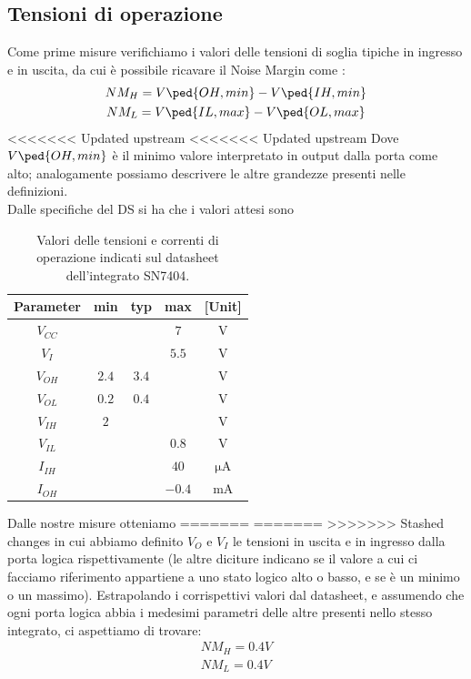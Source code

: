 \documentclass[10pt, a4paper, italian]{article}
\begin{document}
\subsection{Tensioni di operazione}
\label{TENSIONI}
Come prime misure verifichiamo i valori delle tensioni di soglia tipiche in ingresso e in uscita, da cui è possibile ricavare il Noise Margin come :
\begin{gather*}
    NM_H = V\ped{OH, min} - V\ped{IH, min}\\
    NM_L = V\ped{IL,max} - V\ped{OL, max}
\end{gather*}
<<<<<<< Updated upstream
<<<<<<< Updated upstream
Dove $V\ped{OH, min}$ è il minimo valore interpretato in output dalla porta come alto; analogamente possiamo descrivere le altre grandezze presenti nelle definizioni.\\
Dalle specifiche del DS si ha che i valori attesi sono %
\begin{table}[htb]
\centering
\begin{tabular}{cccc|c}
\toprule
Parameter  & min & typ & max & [Unit] \\
\midrule
\midrule
$V_{CC}$ &  &  & $7$ & V \\
$V_I$	 &  &  & $5.5$ & V\\
$V_{OH}$ & $2.4$  & $3.4$ & & V \\
$V_{OL}$ & $0.2$  & $0.4$ & & V \\
$V_{IH}$ & $2$  &  & & V  \\
$V_{IL}$ &  &  & $0.8$ & V \\
$I_{IH}$ &  &  & $40$ & $\si{\micro\A}$ \\
$I_{OH}$ &  &  & $-0.4$ & mA \\
\bottomrule 
\end{tabular}

\caption{Valori delle tensioni e correnti di operazione indicati sul
datasheet dell'integrato SN7404.}
\label{tab: notDS}
\end{table}

Dalle nostre misure otteniamo %
=======
=======
>>>>>>> Stashed changes
in cui abbiamo definito $V_O$ e $V_I$ le tensioni in uscita e in ingresso dalla porta logica rispettivamente (le altre diciture indicano se il valore a cui ci facciamo riferimento appartiene a uno stato logico alto o basso, e se è un minimo o un massimo).
Estrapolando i corrispettivi valori dal datasheet, e assumendo che ogni porta logica abbia i medesimi parametri delle altre presenti nello stesso integrato, ci aspettiamo di trovare:
\begin{gather*}
    NM_H=0.4 V\\
    NM_L=0.4 V
\end{gather*}
\end{document}
